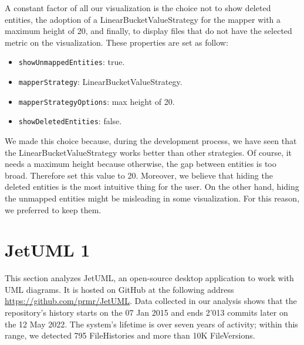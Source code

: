 A constant factor of all our visualization is the choice not to show deleted entities, the adoption of a LinearBucketValueStrategy for the mapper with a maximum height of 20, and finally, to display files that do not have the selected metric on the visualization. 
These properties are set as follow:
\begin{itemize}
    \item \texttt{showUnmappedEntities}: true.
    \item \texttt{mapperStrategy}: LinearBucketValueStrategy.
    \item \texttt{mapperStrategyOptions}: max height of 20.
    \item \texttt{showDeletedEntities}: false.
\end{itemize}
We made this choice because, during the development process, we have seen that the LinearBucketValueStrategy works better than other strategies. Of course, it needs a maximum height because otherwise, the gap between entities is too broad. Therefore set this value to 20. Moreover, we believe that hiding the deleted entities is the most intuitive thing for the user. On the other hand, hiding the unmapped entities might be misleading in some visualization. For this reason, we preferred to keep them. 



\section{JetUML 1}
This section analyzes JetUML, an open-source desktop application to work with UML diagrams. It is hosted on GitHub at the following address \url{https://github.com/prmr/JetUML}. Data collected in our analysis shows that the repository's history starts on the 07 Jan 2015 and ends 2'013 commits later on the 12 May 2022. The system's lifetime is over seven years of activity; within this range, we detected 795 FileHistories and more than 10K FileVersions.

